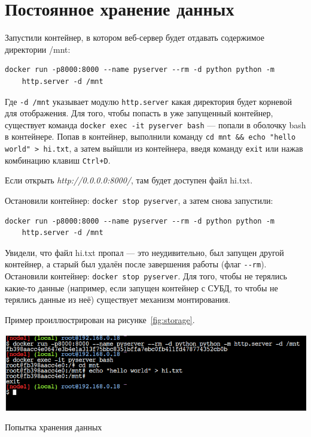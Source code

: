 \section{Постоянное хранение данных}
Запустили контейнер, в котором веб-сервер будет отдавать
содержимое директории /mnt:

\begin{verbatim}
docker run -p8000:8000 --name pyserver --rm -d python python -m
	http.server -d /mnt
\end{verbatim}

Где \texttt{-d /mnt} указывает модулю
\texttt{http.server} какая директория будет корневой для отображения.
Для того, чтобы попасть в уже запущенный контейнер,
существует команда \texttt{docker exec -it pyserver bash} --- попали
в оболочку bash в контейнере. Попав в контейнер, выполнили команду
\verb|cd mnt && echo "hello world" > hi.txt|, а затем выйшли из контейнера,
введя команду \texttt{exit} или нажав комбинацию клавиш \texttt{Ctrl+D}.\par
Если открыть \textit{http://0.0.0.0:8000/},
там будет доступен файл hi.txt.\par
Остановили контейнер: \texttt{docker stop pyserver}, а затем снова запустили:

\begin{verbatim}
docker run -p8000:8000 --name pyserver --rm -d python python -m
	http.server -d /mnt
\end{verbatim}

Увидели, что файл hi.txt пропал --- это неудивительно, был запущен
другой контейнер, а старый был удалён после завершения работы
(флаг \verb|--rm|).
Остановили контейнер: \texttt{docker stop pyserver}.
Для того, чтобы не терялись какие-то данные
(например, если запущен контейнер с СУБД, то чтобы
не терялись данные из неё) существует механизм монтирования.\par
Пример проиллюстрирован на рисунке~\ref{fig:storage}.

\begin{image}
	\includegraphics[width=1\textwidth]{Screenshot from 2023-04-15 15-51-10}
	\caption{Попытка хранения данных}
	\label{fig:storage}
\end{image}

